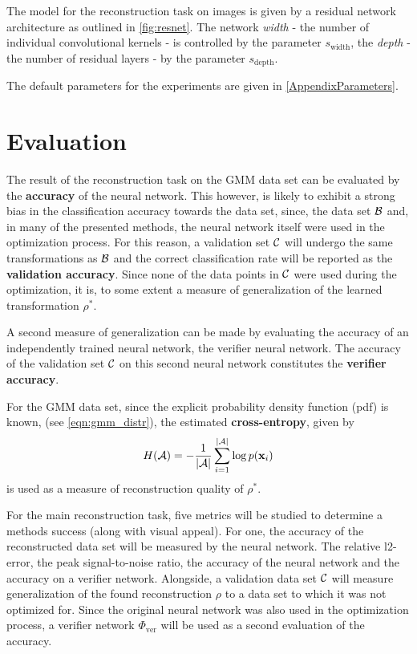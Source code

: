 The model for the reconstruction task on images is given by a residual network architecture
as outlined in \ref{fig:resnet}. 
The network \textit{width} - the number of individual convolutional kernels - is controlled by the parameter $s_\text{width}$, the \textit{depth} - the number of residual layers - by the parameter
$s_\text{depth}$.

The default parameters for the experiments are given in \ref{AppendixParameters}.




\section{Evaluation}
\label{sec:evaluation}



The result of the reconstruction task on the GMM data set can be evaluated by the \textbf{accuracy}
of the neural network. This however, is likely to exhibit a strong bias in the classification accuracy 
towards the data set, since, the data set $\mathcal B$ and, in many of the presented methods,
the neural network itself were used in the optimization process.
For this reason, a validation set $\mathcal C$ will undergo the same transformations 
as $\mathcal B$ and the correct classification rate will be reported as the \textbf{validation accuracy}. 
Since none of the data points in $\mathcal C$
were used during the optimization, it is, to some extent a measure of generalization
of the learned transformation $\rho^*$.

A second measure of generalization can be made by evaluating the accuracy of an
independently trained neural network, the verifier neural network.
The accuracy of the validation set $\mathcal C$ on this second neural network 
constitutes the \textbf{verifier accuracy}.

For the GMM data set, since the explicit probability density function (pdf) is known, 
(see \ref{eqn:gmm_distr}), the estimated \textbf{cross-entropy}, given by
\begin{equation}
\label{eqn:cross_entropy}
    H(\mathcal A) = - \frac 1 {|\mathcal A|} \sum_{i=1}^{|\mathcal A|} \log p(\mathbf x_i)
\end{equation}
is used as a measure of reconstruction quality of $\rho^*$.

For the main reconstruction task, 
five metrics will be studied to determine a methods success (along with visual appeal).
For one, the accuracy of the reconstructed data set will be measured by the neural network.
The relative l2-error, the peak signal-to-noise ratio, the accuracy of the neural network and the accuracy on a verifier network.
Alongside, a validation data set $\mathcal C$ will measure generalization of the found reconstruction $\rho$ to a data set to which it was not optimized for.
Since the original neural network was also used in the optimization process, a verifier network $\Phi_{\text{ver}}$ will be used as a second evaluation of the accuracy.


